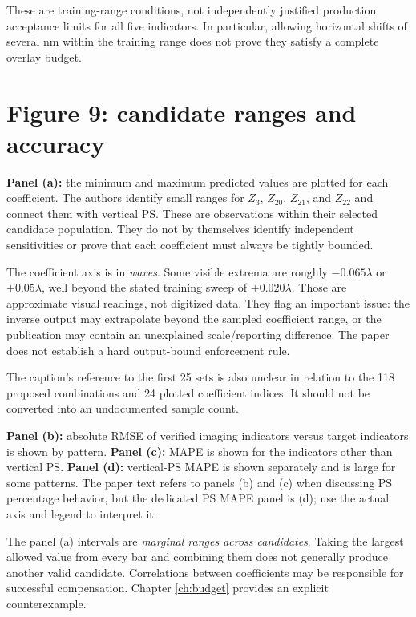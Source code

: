 These are training-range conditions, not independently justified
production acceptance limits for all five indicators.
In particular, allowing horizontal shifts of several nm within the
training range does not prove they satisfy a complete overlay budget.

\section{Figure 9: candidate ranges and accuracy}
\textbf{Panel (a):} the minimum and maximum predicted values are plotted
for each coefficient. The authors identify small ranges for $Z_3$,
$Z_{20}$, $Z_{21}$, and $Z_{22}$ and connect them with vertical PS.
These are observations within their selected candidate population.
They do not by themselves identify independent sensitivities or prove
that each coefficient must always be tightly bounded.

The coefficient axis is in \emph{waves}. Some visible extrema are
roughly $-0.065\lambda$ or $+0.05\lambda$, well beyond the stated
training sweep of $\pm0.020\lambda$.
Those are approximate visual readings, not digitized data.
They flag an important issue: the inverse output may extrapolate beyond
the sampled coefficient range, or the publication may contain an
unexplained scale/reporting difference.
The paper does not establish a hard output-bound enforcement rule.

The caption's reference to the first 25 sets is also unclear in relation
to the 118 proposed combinations and 24 plotted coefficient indices.
It should not be converted into an undocumented sample count.

\textbf{Panel (b):} absolute RMSE of verified imaging indicators versus
target indicators is shown by pattern.
\textbf{Panel (c):} MAPE is shown for the indicators other than vertical
PS. \textbf{Panel (d):} vertical-PS MAPE is shown separately and is
large for some patterns. The paper text refers to panels (b) and (c)
when discussing PS percentage behavior, but the dedicated PS MAPE
panel is (d); use the actual axis and legend to interpret it.

The panel (a) intervals are \emph{marginal ranges across candidates}.
Taking the largest allowed value from every bar and combining them
does not generally produce another valid candidate.
Correlations between coefficients may be responsible for successful
compensation. Chapter \ref{ch:budget} provides an explicit counterexample.

